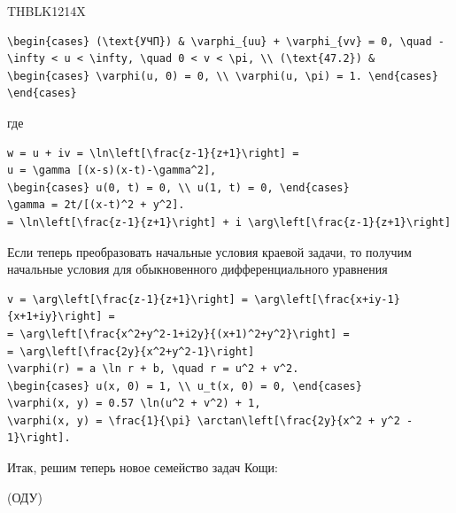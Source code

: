\documentclass[
  ukrainian,
]{article}
\begin{document}
THBLK1214X

\begin{verbatim}
\begin{cases} (\text{УЧП}) & \varphi_{uu} + \varphi_{vv} = 0, \quad -\infty < u < \infty, \quad 0 < v < \pi, \\ (\text{47.2}) & \begin{cases} \varphi(u, 0) = 0, \\ \varphi(u, \pi) = 1. \end{cases} \end{cases}
\end{verbatim}

где

\begin{verbatim}
w = u + iv = \ln\left[\frac{z-1}{z+1}\right] =
u = \gamma [(x-s)(x-t)-\gamma^2],
\begin{cases} u(0, t) = 0, \\ u(1, t) = 0, \end{cases}
\gamma = 2t/[(x-t)^2 + y^2].
= \ln\left[\frac{z-1}{z+1}\right] + i \arg\left[\frac{z-1}{z+1}\right]
\end{verbatim}

Если теперь преобразовать начальные условия краевой задачи, то получим
начальные условия для обыкновенного дифференциального уравнения

\begin{verbatim}
v = \arg\left[\frac{z-1}{z+1}\right] = \arg\left[\frac{x+iy-1}{x+1+iy}\right] =
= \arg\left[\frac{x^2+y^2-1+i2y}{(x+1)^2+y^2}\right] =
= \arg\left[\frac{2y}{x^2+y^2-1}\right]
\varphi(r) = a \ln r + b, \quad r = u^2 + v^2.
\begin{cases} u(x, 0) = 1, \\ u_t(x, 0) = 0, \end{cases}
\varphi(x, y) = 0.57 \ln(u^2 + v^2) + 1,
\varphi(x, y) = \frac{1}{\pi} \arctan\left[\frac{2y}{x^2 + y^2 - 1}\right].
\end{verbatim}

Итак, решим теперь новое семейство задач Кощи:

(ОДУ)
\end{document}
